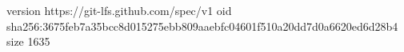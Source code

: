 version https://git-lfs.github.com/spec/v1
oid sha256:3675feb7a35bcc8d015275ebb809aaebfc04601f510a20dd7d0a6620ed6d28b4
size 1635
